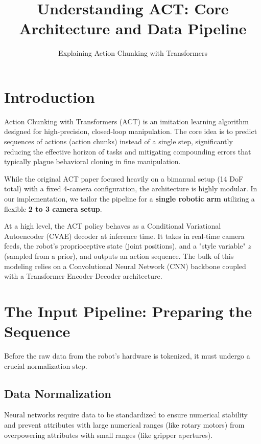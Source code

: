 \documentclass[11pt,a4paper]{article}
\title{\textbf{Understanding ACT: Core Architecture and Data Pipeline}}
\author{Explaining Action Chunking with Transformers}
\date{\vspace{-5ex}}
\begin{document}
\maketitle

\section{Introduction}
Action Chunking with Transformers (ACT) is an imitation learning algorithm designed for high-precision, closed-loop manipulation. The core idea is to predict sequences of actions (action chunks) instead of a single step, significantly reducing the effective horizon of tasks and mitigating compounding errors that typically plague behavioral cloning in fine manipulation.

While the original ACT paper focused heavily on a bimanual setup (14 DoF total) with a fixed 4-camera configuration, the architecture is highly modular. In our implementation, we tailor the pipeline for a \textbf{single robotic arm} utilizing a flexible \textbf{2 to 3 camera setup}.

At a high level, the ACT policy behaves as a Conditional Variational Autoencoder (CVAE) decoder at inference time. It takes in real-time camera feeds, the robot's proprioceptive state (joint positions), and a "style variable" $z$ (sampled from a prior), and outputs an action sequence. The bulk of this modeling relies on a Convolutional Neural Network (CNN) backbone coupled with a Transformer Encoder-Decoder architecture.

\section{The Input Pipeline: Preparing the Sequence}
Before the raw data from the robot's hardware is tokenized, it must undergo a crucial normalization step. 

\subsection{Data Normalization}
Neural networks require data to be standardized to ensure numerical stability and prevent attributes with large numerical ranges (like rotary motors) from overpowering attributes with small ranges (like gripper apertures).
\end{document}
